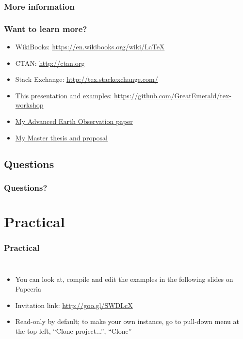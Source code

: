 \documentclass[xetex,colorlinks]{beamer} %
\begin{document}
  \subsubsection{More information}
  \begin{frame}
    \frametitle{Want to learn more?}
    \begin{itemize}
     \item WikiBooks: \href{https://en.wikibooks.org/wiki/LaTeX}{https://en.wikibooks.org/wiki/LaTeX}
     \item CTAN: \href{http://ctan.org}{http://ctan.org}
     \item Stack Exchange: \href{http://tex.stackexchange.com/}{http://tex.stackexchange.com/}
     \item This presentation and examples: \href{https://github.com/GreatEmerald/tex-workshop}{https://github.com/GreatEmerald/tex-workshop}
     \item \href{https://github.com/GreatEmerald/AEO-validation-paper/tree/master/paper}{My Advanced Earth Observation paper}
     \item \href{https://github.com/GreatEmerald/master-classification/tree/master/thesis}{My Master thesis and proposal}
    \end{itemize}
  \end{frame}
  
  \subsection{Questions}
  \begin{frame}
    \frametitle{Questions?}
    \tableofcontents[sectionstyle=shaded/show,subsectionstyle=shaded/shaded/show,subsubsectionstyle=shaded/shaded/shaded/show]
  \end{frame}

  
  \section{Practical}
  \begin{frame}
    \frametitle{Practical}
    \begin{columns}
      \begin{itemize}
      \item You can look at, compile and edit the examples in the following slides on Papeeria
      \item Invitation link: \href{https://www.papeeria.com/join?token_id=8faf5720-6d5f-4a99-9c53-4ca65d621d9b&retry=3}{http://goo.gl/SWDLcX}
      \item Read-only by default; to make your own instance, go to pull-down menu at the top left, ``Clone project...'', ``Clone''
      \end{itemize}
    \end{columns}
  \end{frame}
\end{document}
